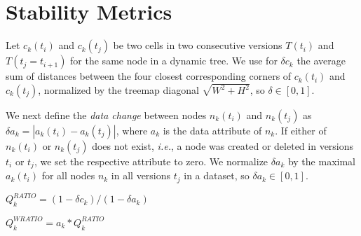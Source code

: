 \documentclass[11pt]{article}
\begin{document}
    \section{Stability Metrics}\label{stability-metrics}

Let \(c_k(t_i)\) and \(c_k(t_j)\) be two cells in two consecutive
versions \(T(t_i)\) and \(T(t_j=t_{i+1})\) for the same node in a
dynamic tree. We use for \(\delta c_k\) the average sum of distances
between the four closest corresponding corners of \(c_k(t_i)\) and
\(c_k(t_j)\), normalized by the treemap diagonal \(\sqrt{W^2+H^2}\), so
\(\delta \in [0,1]\).

We next define the \emph{data change} between nodes \(n_k(t_i)\) and
\(n_k(t_j)\) as \(\delta a_k = |a_k(t_i)-a_k(t_j)|\), where \(a_k\) is
the data attribute of \(n_k\). If either of \(n_k(t_i)\) or \(n_k(t_j)\)
does not exist, \emph{i.e.}, a node was created or deleted in versions
\(t_i\) or \(t_j\), we set the respective attribute to zero. We
normalize \(\delta a_k\) by the maximal \(a_k(t_i)\) for all nodes
\(n_k\) in all versions \(t_j\) in a dataset, so
\(\delta a_k \in [0,1]\).

\(Q^{RATIO}_k = (1-\delta c_k) / (1 - \delta a_k)\)

\(Q^{WRATIO}_k = a_k * Q^{RATIO}_k\)
\end{document}
